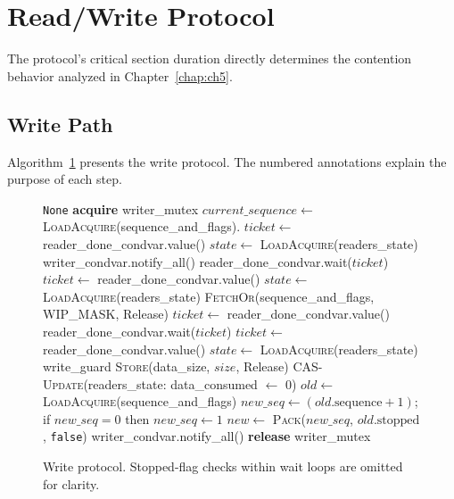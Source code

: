 \section{Read/Write Protocol}
\label{sec:protocol}

The protocol's critical section duration directly determines the contention behavior analyzed in Chapter~\ref{chap:ch5}.

\subsection{Write Path}
\label{subsec:write_path}

Algorithm~\ref{alg:write} presents the write protocol. The numbered annotations explain the purpose of each step.

\begin{figure}[htbp]
\begin{algorithmic}[1]
     \Return \texttt{None} \EndIf {}
    \State \textbf{acquire} writer\_mutex 
    \State $current\_sequence \gets$ \textsc{LoadAcquire}(sequence\_and\_flags).
    \State $ticket \gets$ reader\_done\_condvar.value()
    \State $state \gets$ \textsc{LoadAcquire}(readers\_state)
            \State writer\_condvar.notify\_all() 
            \State reader\_done\_condvar.wait($ticket$)
            \State $ticket \gets$ reader\_done\_condvar.value()
            \State $state \gets$ \textsc{LoadAcquire}(readers\_state)
        \EndWhile
    \EndIf
    \State \textsc{FetchOr}(sequence\_and\_flags, WIP\_MASK, Release) 
    \State $ticket \gets$ reader\_done\_condvar.value()
     
        \State reader\_done\_condvar.wait($ticket$)
        \State $ticket \gets$ reader\_done\_condvar.value()
        \State $state \gets$ \textsc{LoadAcquire}(readers\_state)
    \EndWhile
    \State \Return write\_guard 
\EndFunction
\Statex
{}
    \State \textsc{Store}(data\_size, $size$, Release)
    \State \textsc{CAS-Update}(readers\_state: data\_consumed $\gets$ 0)
    \Repeat {}
        \State $old \gets$ \textsc{LoadAcquire}(sequence\_and\_flags)
        \State $new\_seq \gets (old.\text{sequence} + 1)$; if $new\_seq = 0$ then $new\_seq \gets 1$
        \State $new \gets$ \textsc{Pack}($new\_seq$, $old.\text{stopped}$, \texttt{false})
    \State writer\_condvar.notify\_all() 
    \State \textbf{release} writer\_mutex
\EndFunction
\end{algorithmic}
\caption{Write protocol. Stopped-flag checks within wait loops are omitted for clarity.}
\label{alg:write}
\end{figure}

